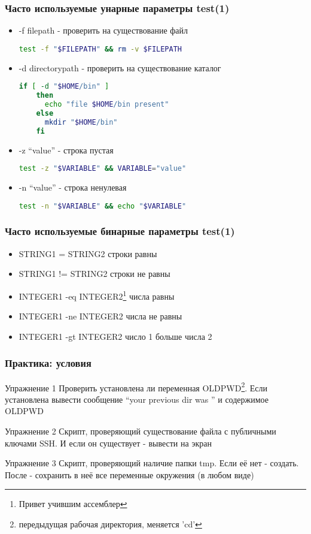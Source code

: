 \begin{frame}[fragile]
  \frametitle{Часто используемые унарные параметры test(1)}
  \begin{itemize}
    \item \alert{-f filepath} - проверить на существование файл
\begin{lstlisting}[language=sh,frame=single,basicstyle=\normalsize,breaklines=true]
	test -f "$FILEPATH" && rm -v $FILEPATH
\end{lstlisting} \pause
    \item \alert{-d directorypath} - проверить на существование каталог
\begin{lstlisting}[language=sh,frame=single,basicstyle=\tiny,breaklines=true]
	if [ -d "$HOME/bin" ]
	then 
	  echo "file $HOME/bin present"
	else
	  mkdir "$HOME/bin"
	fi
\end{lstlisting} \pause
    \item \alert{-z ``value''} - строка пустая
\begin{lstlisting}[language=sh,frame=single,basicstyle=\normalsize,breaklines=true]
	test -z "$VARIABLE" && VARIABLE="value"
\end{lstlisting} \pause
    \item \alert{-n ``value''} - строка ненулевая
\begin{lstlisting}[language=sh,frame=single,basicstyle=\normalsize,breaklines=true]
	test -n "$VARIABLE" && echo "$VARIABLE"
\end{lstlisting} 
  \end{itemize}

\end{frame}

\begin{frame}[fragile]
  \frametitle{Часто используемые бинарные параметры test(1)}
  \begin{itemize}
    \item \alert{STRING1 = STRING2} строки равны
    \item \alert{STRING1 != STRING2} строки не равны
    \item \alert{INTEGER1 -eq INTEGER2}\footnote{Привет учившим ассемблер} числа равны
    \item \alert{INTEGER1 -ne INTEGER2} числа не равны
    \item \alert{INTEGER1 -gt INTEGER2} число 1 больше числа 2
  \end{itemize}
\end{frame}

\begin{frame}[fragile]
  \frametitle{Практика: условия}

  \alert{Упражнение 1} Проверить установлена ли переменная OLDPWD\footnote{передыдущая рабочая директория, меняется 'cd'}. Если установлена вывести сообщение ``your previous dir was '' и содержимое OLDPWD \pause

  \alert{Упражнение 2} Скрипт, проверяющий существование файла с публичными ключами SSH. И если он существует - вывести на экран  \pause

  \alert{Упражнение 3} Скрипт, проверяющий наличие папки tmp. Если её нет - создать. После - сохранить в неё все переменные окружения (в любом виде)
\end{frame}


